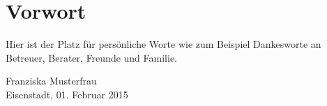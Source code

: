 \newpage
{}
\chapter*{Vorwort}
Hier ist der Platz für persönliche Worte wie zum Beispiel Dankesworte an Betreuer, Berater, Freunde und Familie.
\vspace{8cm}
\\
\begin{flushright}
	Franziska Musterfrau
	\\Eisenstadt, 01. Februar 2015
\end{flushright}